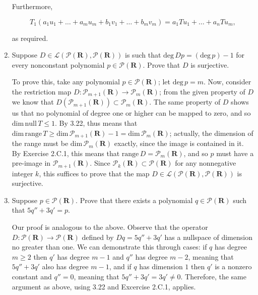 \documentclass{book}
\begin{document}
\begin{enumerate}
Furthermore,

\begin{equation*}
    T_1(a_1u_1+\dots+a_mu_m+b_1v_1+\dots+b_mv_m) = a_1Tu_1+\dots+a_nTu_m,
\end{equation*}

as required.

\item Suppose \(D \in \mathcal{L}(\mathcal{P}(\textbf{R}),\mathcal{P}(\textbf{R}))\) is such that \(\textrm{deg} \, Dp = (\textrm{deg} \, p)-1\) for every nonconstant polynomial \(p \in \mathcal{P}(\textbf{R})\).  Prove that \(D\) is surjective.

To prove this, take any polynomial \(p \in \mathcal{P}(\textbf{R})\); let \(\textrm{deg} \, p = m\).  Now, consider the restriction map \(D: \mathcal{P}_{m + 1}(\textbf{R}) \rightarrow \mathcal{P}_m(\textbf{R})\); from the given property of \(D\) we know that \(D(\mathcal{P}_{m + 1}(\textbf{R})) \subset \mathcal{P}_m(\textbf{R})\).  The same property of \(D\) shows us that no polynomial of degree one or higher can be mapped to zero, and so \(\textrm{dim} \, \textrm{null} \, T \leq 1\).  By 3.22, thus means that \(\textrm{dim} \, \textrm{range} \, T \geq \textrm{dim} \, \mathcal{P}_{m + 1}(\textbf{R}) - 1 = \textrm{dim} \, \mathcal{P}_m(\textbf{R})\); actually, the dimension of the range must be \(\textrm{dim} \, \mathcal{P}_m(\textbf{R})\) exactly, since the image is contained in it.  By Exercise 2.C.1, this means that \(\textrm{range} \, D = \mathcal{P}_m(\textbf{R})\), and so \(p\) must have a pre-image in \(\mathcal{P}_{m + 1}(\textbf{R})\).  Since \(\mathcal{P}_k(\textbf{R}) \subset \mathcal{P}(\textbf{R})\) for any nonnegative integer \(k\), this suffices to prove that the map \(D \in \mathcal{L}(\mathcal{P}(\textbf{R}),\mathcal{P}(\textbf{R}))\) is surjective.

\item Suppose \(p \in \mathcal{P}(\textbf{R})\).  Prove that there exists a polynomial \(q \in \mathcal{P}(\textbf{R})\) such that \(5q''+3q'=p\).

Our proof is analogous to the above.  Observe that the operator \(D: \mathcal{P}(\textbf{R}) \rightarrow \mathcal{P}(\textbf{R})\) defined by \(Dq=5q''+3q'\) has a nullspace of dimension no greater than one.  We can demonstrate this through cases: if \(q\) has degree \(m \geq 2\) then \(q'\) has degree \(m-1\) and \(q''\) has degree \(m-2\), meaning that \(5q''+3q'\) also has degree \(m-1\), and if \(q\) has dimension \(1\) then \(q'\) is a nonzero constant and \(q''=0\), meaning that \(5q''+3q' = 3q' \neq 0\).  Therefore, the same argument as above, using 3.22 and Excercise 2.C.1, applies.


\end{enumerate}
\end{document}
